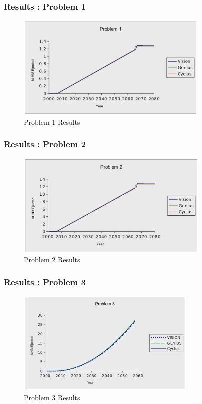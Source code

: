\begin{frame}[ctb!]
  \frametitle{Results : Problem 1}
  \begin{figure}[htbp!]
    \begin{center}
      \includegraphics[height=5cm]{p1.ps}
    \end{center}
    \caption{Problem 1 Results} 
    \label{fig:p1}
  \end{figure}
\end{frame}

\begin{frame}[ctb!]
  \frametitle{Results : Problem 2}
  \begin{figure}[htbp!]
    \begin{center}
      \includegraphics[height=5cm]{p2.ps}
    \end{center}
    \caption{Problem 2 Results} 
    \label{fig:p2}
  \end{figure}
\end{frame}

\begin{frame}[ctb!]
  \frametitle{Results : Problem 3}
  \begin{figure}[htbp!]
    \begin{center}
      \includegraphics[height=5cm]{p3.ps}
    \end{center}
    \caption{Problem 3 Results} 
    \label{fig:p3}
  \end{figure}
\end{frame}

